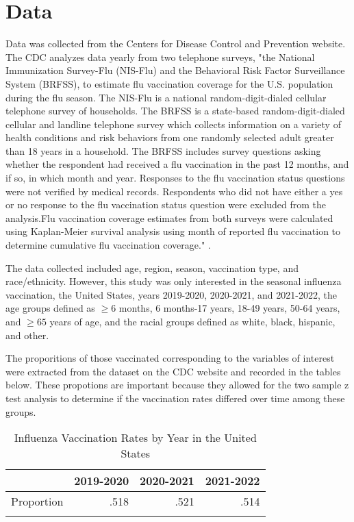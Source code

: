 \documentclass[12pt]{article}
\begin{document}
\section{Data}
\label{sec:data}
Data was collected from the Centers for Disease Control and Prevention website. The CDC analyzes data yearly from two telephone surveys, 
"the National Immunization Survey-Flu (NIS-Flu) and the Behavioral Risk Factor Surveillance System (BRFSS), to estimate flu vaccination 
coverage for the U.S. population during the flu season. The NIS-Flu is a national random-digit-dialed cellular telephone survey of households.
The BRFSS is a state-based random-digit-dialed cellular and landline telephone survey which collects information on a variety of health conditions 
and risk behaviors from one randomly selected adult greater than 18 years in a household. The BRFSS includes survey questions asking whether the respondent had 
received a flu vaccination in the past 12 months, and if so, in which month and year. Responses to the flu vaccination status questions were not verified by medical records. 
Respondents who did not have either a yes or no response to the flu vaccination status question were excluded from the analysis.Flu vaccination coverage estimates from both surveys 
were calculated using Kaplan-Meier survival analysis using month of reported flu vaccination to determine cumulative flu vaccination coverage." \citep{cdc_2021}. \par
The data collected included age, region, season, vaccination type, and race/ethnicity. However, this study was only interested in the seasonal influenza vaccination, the United States,
years 2019-2020, 2020-2021, and 2021-2022, the age groups defined as $\ge6$ months, 6 months-17 years, 18-49 years, 50-64 years, and $\ge 65$ years of age, and the racial groups defined
as white, black, hispanic, and other.\par
The proporitions of those vaccinated corresponding to the variables of interest were extracted from the dataset on the CDC website and recorded in the tables below. These propotions are important
because they allowed for the two sample z test analysis to determine if the vaccination rates differed over time among these groups.\par

\begin{table}[h!]
    \centering
    \caption{Influenza Vaccination Rates by Year in the United States}
    \label{tab:table:proporitonsyear}
     \begin{tabularx}{.8\textwidth}{X rrr}
      \lsptoprule
                & 2019-2020 & 2020-2021  & 2021-2022\\
      \midrule
      Proportion  &   .518  &    .521  &    .514\\
      \lspbottomrule
     \end{tabularx}
    \end{table}
\end{document}
